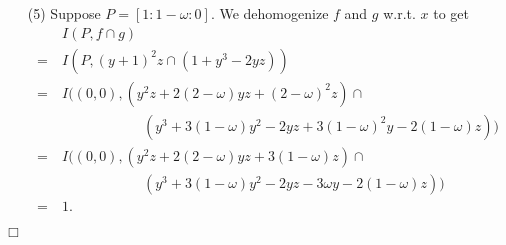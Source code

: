 \documentclass{article}
\begin{document}
\begin{enumerate}
\item[(5)]
  Suppose $P = [1:1-\omega:0]$.
  We dehomogenize $f$ and $g$ w.r.t. $x$ to get
  \begin{align*}
    & \: I(P, f \cap g) \\
    =& \: I(P, (y+1)^2z \cap (1+y^3 - 2yz)) \\
    =& \: I((0,0), (y^2z + 2(2-\omega)yz + (2-\omega)^2z) \cap \\
      & \qquad\qquad\qquad
      (y^3 + 3(1-\omega)y^2 - 2yz + 3(1-\omega)^2 y - 2(1-\omega)z)) \\
    =& \: I((0,0), (y^2z + 2(2-\omega)yz + 3(1-\omega)z) \cap \\
      & \qquad\qquad\qquad
      (y^3 + 3(1-\omega)y^2 - 2yz - 3\omega y - 2(1-\omega)z)) \\
    =& \: 1.
  \end{align*}
\end{enumerate}
$\Box$ \\
\end{document}
